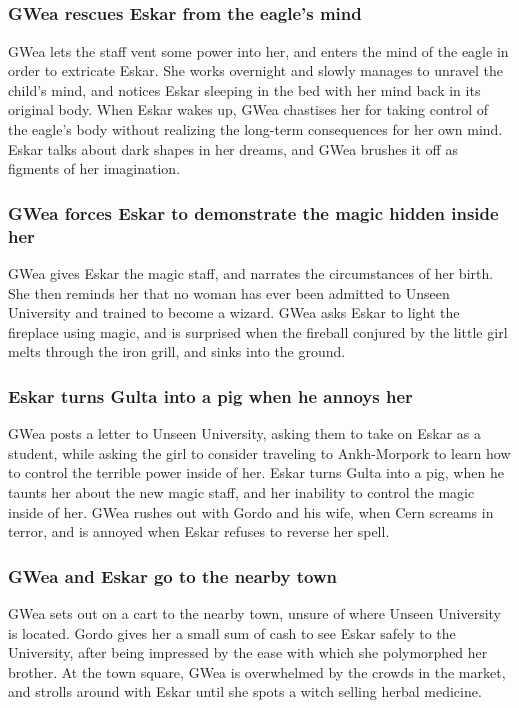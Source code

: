 \subsection{}
\subsubsection{\Gls{GWea} rescues \Gls{Eskar} from the eagle's mind}
\Gls{GWea} lets the staff vent some power into her, and enters the mind of the eagle in order to
extricate \Gls{Eskar}. She works overnight and slowly manages to unravel the child's mind, and
notices \Gls{Eskar} sleeping in the bed with her mind back in its original body. When \Gls{Eskar}
wakes up, \Gls{GWea} chastises her for taking control of the eagle's body without realizing the
long-term consequences for her own mind. \Gls{Eskar} talks about dark shapes in her dreams, and
\Gls{GWea} brushes it off as figments of her imagination.

\subsubsection{\Gls{GWea} forces \Gls{Eskar} to demonstrate the magic hidden inside her}
\Gls{GWea} gives \Gls{Eskar} the magic staff, and narrates the circumstances of her birth. She
then reminds her that no woman has ever been admitted to Unseen University and trained to become a
wizard. \Gls{GWea} asks \Gls{Eskar} to light the fireplace using magic, and is surprised when the
fireball conjured by the little girl melts through the iron grill, and sinks into the ground.

\subsubsection{\Gls{Eskar} turns \Gls{Gulta} into a pig when he annoys her}
\Gls{GWea} posts a letter to Unseen University, asking them to take on \Gls{Eskar} as a student,
while asking the girl to consider traveling to Ankh-Morpork to learn how to control the terrible
power inside of her. \Gls{Eskar} turns \Gls{Gulta} into a pig, when he taunts her about the new
magic staff, and her inability to control the magic inside of her. \Gls{GWea} rushes out with
\Gls{Gordo} and his wife, when \Gls{Cern} screams in terror, and is annoyed when \Gls{Eskar} refuses
to reverse her spell.

\subsubsection{\Gls{GWea} and \Gls{Eskar} go to the nearby town}
\Gls{GWea} sets out on a cart to the nearby town, unsure of where Unseen University is located.
\Gls{Gordo} gives her a small sum of cash to see \Gls{Eskar} safely to the University, after being
impressed by the ease with which she polymorphed her brother. At the town square, \Gls{GWea} is
overwhelmed by the crowds in the market, and strolls around with \Gls{Eskar} until she spots a
witch selling herbal medicine.

